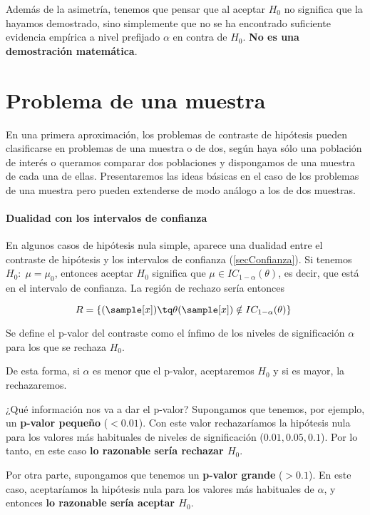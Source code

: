 \documentclass{apuntes}
\begin{document}
Además de la asimetría, tenemos que pensar que al aceptar $H_0$ no significa que la hayamos demostrado, sino simplemente que no se ha encontrado suficiente evidencia empírica a nivel prefijado $\alpha$ en contra de $H_0$. \textbf{No es una demostración matemática}.

\newpage
\section{Problema de una muestra}

En una primera aproximación, los problemas de contraste de hipótesis  pueden clasificarse en problemas de una muestra o de dos, según haya sólo una población de interés o queramos comparar dos poblaciones y dispongamos de una muestra de cada una de ellas. Presentaremos las ideas básicas en el caso de los problemas de una muestra pero pueden extenderse de modo análogo a los de dos muestras.

\paragraph{Dualidad con los intervalos de confianza}

En algunos casos de hipótesis nula simple, aparece una dualidad entre el contraste de hipótesis y los intervalos de confianza (\ref{secConfianza}). Si tenemos $H_0:\; \mu = \mu_0$, entonces aceptar $H_0$ significa que $\mu \in IC_{1 - \alpha}(\theta)$, es decir, que está en el intervalo de confianza. La región de rechazo sería entonces

\[ R = \{ (\sample[x])\tq \theta(\sample[x]) \notin IC_{1 - \alpha}(\theta) \} \]

\begin{defn} Se define el p-valor del contraste como el ínfimo de los niveles de significación $\alpha$ para los que se rechaza $H_0$.

De esta forma, si $\alpha$ es menor que el p-valor, aceptaremos $H_0$ y si es mayor, la rechazaremos.
\end{defn}

¿Qué información nos va a dar el p-valor? Supongamos que tenemos, por ejemplo, un \textbf{p-valor pequeño} ($ < 0.01$). Con este valor rechazaríamos la hipótesis nula para los valores más habituales de niveles de significación ($0.01, 0.05, 0.1$). Por lo tanto, en este caso \textbf{lo razonable sería rechazar $H_0$}.

Por otra parte, supongamos que tenemos un \textbf{p-valor grande} ($ > 0.1 $). En este caso, aceptaríamos la hipótesis nula para los valores más habituales de $\alpha$, y entonces \textbf{lo razonable sería aceptar $H_0$}.
\end{document}
